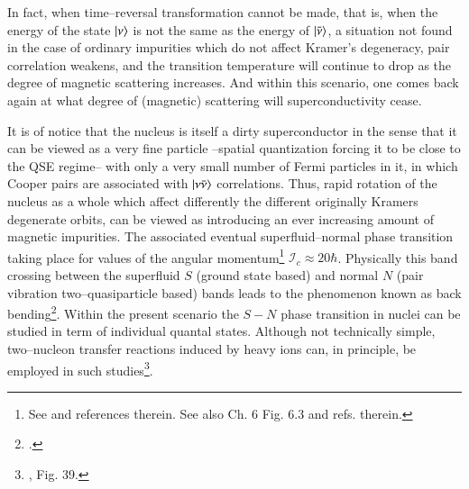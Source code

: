 In fact,  when time--reversal transformation cannot be made, that is, when the energy of the state $|{\nu} \rangle$ is not the same as the energy of $|{\bar\nu} \rangle$, a situation not found in the case of ordinary impurities which do not affect Kramer's degeneracy, pair correlation weakens, and the transition temperature will continue to drop as the degree of magnetic scattering increases. And within this scenario, one comes back again at what degree of (magnetic) scattering will superconductivity cease.


It is of notice that the nucleus is itself a dirty superconductor in the sense that it can be viewed as a very fine particle --spatial quantization forcing it to be close to the QSE regime-- with only a very small number of Fermi particles in it, in which Cooper pairs are associated with $|{\nu\bar\nu} \rangle$ correlations. Thus, rapid rotation of the nucleus as a whole which affect differently the different originally Kramers degenerate orbits, can be viewed as introducing an ever increasing amount of magnetic impurities. The associated eventual superfluid--normal phase transition taking place for values of the angular momentum\footnote{See \cite{Bohr:75} and references therein. See also \cite{Brink:05} Ch. 6 Fig. 6.3 and refs. therein.} $\mathcal I_c\approx20\hbar$. Physically this band crossing between the superfluid $S$ (ground state based) and normal $N$ (pair vibration two--quasiparticle based) bands leads to the phenomenon known as back bending\footnote{\cite{Bohr:75,Stephens:72,Johnson:72}.}. Within the present scenario the $S-N$ phase transition in nuclei can be studied in term of individual quantal states. Although not  technically simple, two--nucleon transfer reactions induced by heavy ions can, in principle, be employed in such studies\footnote{\cite{Broglia:86,Shimizu:89}, Fig. 39.}.
